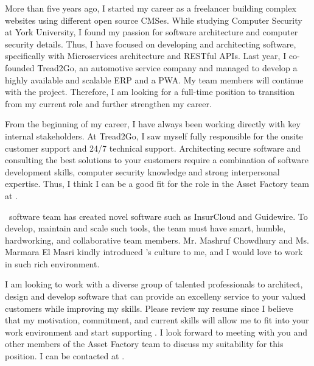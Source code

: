 \documentclass[11pt, a4paper]{awesome-cv}
\begin{document}
\begin{cvletter}
\begin{letterbodyen}
  
  
    More than five years ago, I started my career as a freelancer building complex websites using different open source CMSes. While studying Computer Security at York University, I found my passion for software architecture and computer security details. Thus, I have focused on developing and architecting software, specifically with Microservices architecture and RESTful APIs. Last year, I co-founded Tread2Go, an automotive service company and managed to develop a highly available and scalable ERP and a PWA. My team members will continue with the project. Therefore, I am looking for a full-time position to transition from my current role and further strengthen my career.

    From the beginning of my career, I have always been working directly with key internal stakeholders. At Tread2Go, I saw myself fully responsible for the onsite customer support and 24/7 technical support. Architecting secure software and consulting the best solutions to your customers require a combination of software development skills, computer security knowledge and strong interpersonal expertise. Thus, I think I can be a good fit for the \putposition role in the Asset Factory team at \putcompanyname.
    
    \putcompanyname \ software team has created novel software such as InsurCloud and Guidewire. To develop, maintain and scale such tools, the team must have smart, humble, hardworking, and collaborative team members. Mr. Mashruf Chowdhury and Ms. Marmara El Masri kindly introduced \putcompanyname's culture to me, and I would love to work in such rich environment.

    I am looking to work with a diverse group of talented professionals to architect, design and develop software that can provide an excelleny service to your valued customers while improving my skills. Please review my resume since I believe that my motivation, commitment, and current skills will allow me to fit into your work environment and start supporting \putcompanyname. I look forward to meeting with you and other members of the Asset Factory team to discuss my suitability for this position. I can be contacted at \putmobile.  
  
  
  \end{letterbodyen}
\makeletterclosing

\end{cvletter}
\end{document}
